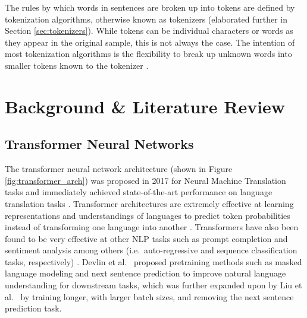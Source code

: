 \documentclass[12pt]{article}
\begin{document}
The rules by which words in sentences are broken up into tokens are defined by tokenization algorithms, otherwise known as tokenizers (elaborated
further in Section \ref{sec:tokenizers}). While tokens can be individual characters or words as they appear in the original sample, this is not always
the case. The intention of most tokenization algorithms is the flexibility to break up unknown words into smaller tokens known to the tokenizer
\cite{wu_googles_2016,sennrich_neural_2016}.

\section{Background \& Literature Review}\label{sec:lit_review}

\subsection{Transformer Neural Networks}
The transformer neural network architecture (shown in Figure \ref{fig:transformer_arch}) was proposed in 2017 for Neural Machine Translation tasks and
immediately achieved state-of-the-art performance on language translation tasks \cite{vaswani_attention_2017}. Transformer architectures are extremely
effective at learning representations and understandings of languages to predict token probabilities instead of transforming one language into another
\cite{devlin_bert_2019,liu_roberta_2019}. Transformers have also been found to be very effective at other NLP tasks such as prompt completion
and sentiment analysis among others (i.e.~auto-regressive and sequence classification tasks, respectively)
\cite{lewis_bart_2019,radford_improving_2018}. Devlin et al.~\cite{devlin_bert_2019} proposed pretraining methods such as masked language modeling
and next sentence prediction to improve natural language understanding for downstream tasks, which was further expanded upon by Liu et
al.~\cite{liu_roberta_2019} by training longer, with larger batch sizes, and removing the next sentence prediction task.
\end{document}
